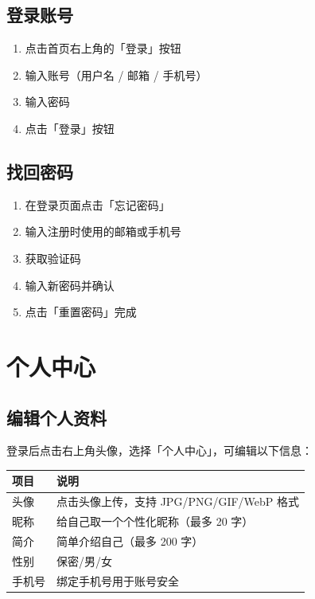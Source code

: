 \documentclass[12pt,a4paper,UTF8]{ctexart}
\begin{document}
\subsection{登录账号}

\begin{enumerate}
    \item 点击首页右上角的「登录」按钮
    \item 输入账号（用户名 / 邮箱 / 手机号）
    \item 输入密码
    \item 点击「登录」按钮
\end{enumerate}

\subsection{找回密码}

\begin{enumerate}
    \item 在登录页面点击「忘记密码」
    \item 输入注册时使用的邮箱或手机号
    \item 获取验证码
    \item 输入新密码并确认
    \item 点击「重置密码」完成
\end{enumerate}

\section{个人中心}

\subsection{编辑个人资料}

登录后点击右上角头像，选择「个人中心」，可编辑以下信息：

\begin{table}[H]
\centering
\begin{tabularx}{\textwidth}{lX}
\toprule
\textbf{项目} & \textbf{说明} \\
\midrule
头像 & 点击头像上传，支持 JPG/PNG/GIF/WebP 格式 \\
昵称 & 给自己取一个个性化昵称（最多 20 字） \\
简介 & 简单介绍自己（最多 200 字） \\
性别 & 保密/男/女 \\
手机号 & 绑定手机号用于账号安全 \\
\bottomrule
\end{tabularx}
\end{table}
\end{document}
